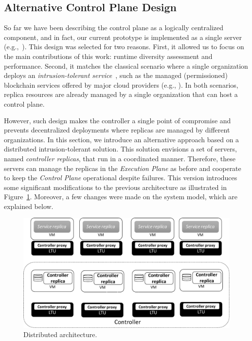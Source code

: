 \subsection{Alternative Control Plane Design}
\label{sec:implementationdecisions}
So far we have been describing the \system control plane as a logically centralized component, and in fact, our current prototype is implemented as a single server (e.g.,~\cite{Roeder:2010,Platania:2014}).
This design was selected for two reasons.
First, it allowed us to focus on the main contributions of this work: runtime diversity assessment and performance.
Second, it matches the classical scenario where a single organization deploys an \emph{intrusion-tolerant service}~\cite{Verissimo:2003}, such as the managed (permissioned) blockchain services offered by major cloud providers (e.g., \cite{amazonblockchain,ibmblockchain}). 
In both scenarios, replica resources are already managed by a single organization that can host a \system control plane.

However, such design makes the controller a single point of compromise and prevents decentralized deployments where replicas are managed by different organizations.
In this section, we introduce an alternative approach based on a distributed intrusion-tolerant solution.
This solution envisions a set of servers, named \emph{controller replicas}, that run \system in a coordinated manner. 
Therefore, these servers can manage the replicas in the \emph{Execution Plane} as before and cooperate to keep the \emph{Control Plane} operational despite failures.
This version introduces some significant modifications to the previous architecture as illustrated in Figure~\ref{fig:lazarus_distributed}.
Moreover, a few changes were made on the system model, which are explained below.



\begin{figure}[t]
\begin{center}
\includegraphics[width=0.9\columnwidth]{images/images/lazarus_distributed.pdf}
\caption{Distributed \system architecture.}
\label{fig:lazarus_distributed}
\end{center}
\end{figure}


